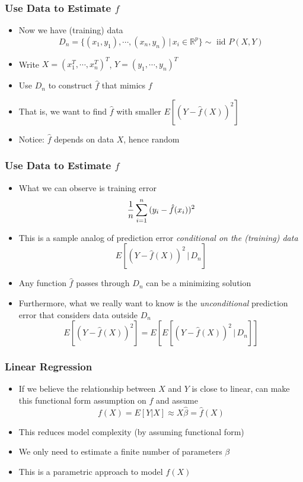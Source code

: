 \documentclass[12pt, xcolor = dvipsnames]{beamer}
\begin{document}
\begin{frame}
\frametitle{Use Data to Estimate $f$}
\begin{itemize}
  \item Now we have (training) data 
  \[D_n=\{(x_1,y_1),\cdots,(x_n,y_n)\,|\,x_i\in\mathbb{R}^p\}\sim \mbox{ iid } P(X,Y)\]
  \item Write $X=(x_1^{T},\cdots,x_n^{T})^{T}$, $Y=(y_1,\cdots,y_n)^{T}$
  \item Use $D_n$ to construct $\hat{f}$ that mimics $f$
  \item That is, we want to find $\hat{f}$ with smaller $E[(Y-\hat{f}(X))^2]$
  \item Notice: $\hat{f}$ depends on data $X$, hence random
\end{itemize}
\end{frame}


\begin{frame}
\frametitle{Use Data to Estimate $f$}
\begin{itemize}
  \item What we can observe is training error
  \[{1\over n}\sum_{i=1}^n{(y_i-\hat{f}(x_i))^2}\]
  \item This is a sample analog of prediction error {\it conditional on the (training) data}
  \[E[(Y-\hat{f}(X))^2\,|\,D_n]\]
  \item Any function $\hat{f}$ passes through $D_n$ can be a minimizing solution
  \item Furthermore, what we really want to know is the {\it unconditional} prediction error that considers data outside $D_n$
  \[E[(Y-\hat{f}(X))^2]=E[E[(Y-\hat{f}(X))^2\,|\,D_n]]\]
\end{itemize}
\end{frame}


\begin{frame}
\frametitle{Linear Regression}
\begin{itemize}
  \item If we believe the relationship between $X$ and $Y$ is close to linear, can make this functional form assumption on $f$ and assume 
  \[f(X)=E[Y|X]\approx X\hat{\beta}=\hat{f}(X)\]
  \item This reduces model complexity (by assuming functional form)
  \item We only need to estimate a finite number of parameters $\beta$
  \item This is a parametric approach to model $f(X)$
\end{itemize}
\end{frame}
\end{document}
